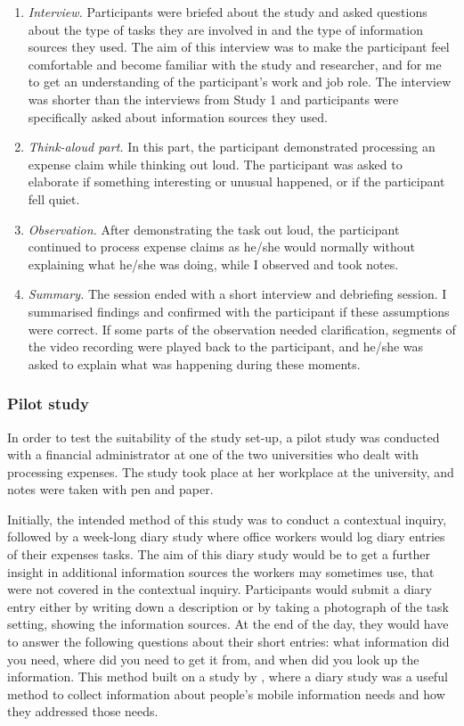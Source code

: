 \begin{enumerate}
\item 
\textit{Interview.} Participants were briefed about the study and asked questions about the type of tasks they are involved in and the type of information sources they used. The aim of this interview was to make the participant feel comfortable and become familiar with the study and researcher, and for me to get an understanding of the participant’s work and job role. The interview was shorter than the interviews from Study 1 and participants were specifically asked about information sources they used.
\item 
\textit{Think-aloud part.}  In this part, the participant demonstrated processing an expense claim while thinking out loud. The participant was asked to elaborate if something interesting or unusual happened, or if the participant fell quiet.
\item 
\textit{Observation.}
After demonstrating the task out loud, the participant continued to process expense claims as he/she would normally without explaining what he/she was doing, while I observed and took notes.
\item 
\textit{Summary.} The session ended with a short interview and debriefing session. I summarised findings and confirmed with the participant if these assumptions were correct. If some parts of the observation needed clarification, segments of the video recording were played back to the participant, and he/she was asked to explain what was happening during these moments.
\end{enumerate}

\subsubsection{Pilot study}
In order to test the suitability of the study set-up, a pilot study was conducted with a financial administrator at one of the two universities who dealt with processing expenses. The study took place at her workplace at the university, and notes were taken with pen and paper. 

Initially, the intended method of this study was to conduct a contextual inquiry, followed by a week-long diary study where office workers would log diary entries of their expenses tasks. The aim of this diary study would be to get a further insight in additional information sources the workers may sometimes use, that were not covered in the contextual inquiry.  Participants would submit a diary entry either by writing down a description or by taking a photograph of the task setting, showing the information sources. At the end of the day, they would have to answer the following questions about their short entries: what information did you need, where did you need to get it from, and when did you look up the information. This method built on a study by \citet{Sohn2008}, where a diary study was a useful method to collect information about people's mobile information needs and how they addressed those needs. 

